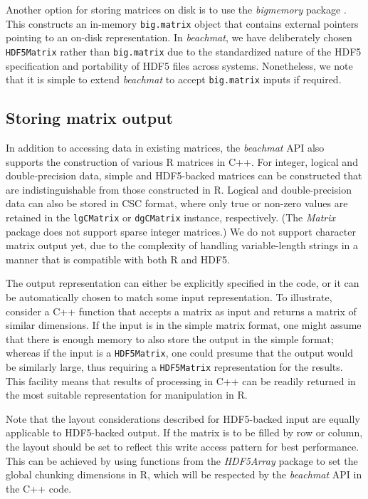 \documentclass[10pt,letterpaper]{article}
\newcommand{\beachmat}{\textit{beachmat}}
\newcommand{\code}[1]{\texttt{#1}}
\begin{document}
Another option for storing matrices on disk is to use the \textit{bigmemory} package \cite{kane2013scalable}.
This constructs an in-memory \code{big.matrix} object that contains external pointers pointing to an on-disk representation.
In \beachmat{}, we have deliberately chosen \code{HDF5Matrix} rather than \code{big.matrix} due to the standardized nature of the HDF5 specification and portability of HDF5 files across systems.
Nonetheless, we note that it is simple to extend \beachmat{} to accept \code{big.matrix} inputs if required.

\subsection*{Storing matrix output}
In addition to accessing data in existing matrices, the \beachmat{} API also supports the construction of various R matrices in C++.
For integer, logical and double-precision data, simple and HDF5-backed matrices can be constructed that are indistinguishable from those constructed in R.
Logical and double-precision data can also be stored in CSC format, where only true or non-zero values are retained in the \code{lgCMatrix} or \code{dgCMatrix} instance, respectively.
(The \textit{Matrix} package does not support sparse integer matrices.)
We do not support character matrix output yet, due to the complexity of handling variable-length strings in a manner that is compatible with both R and HDF5.

The output representation can either be explicitly specified in the code, or it can be automatically chosen to match some input representation.
To illustrate, consider a C++ function that accepts a matrix as input and returns a matrix of similar dimensions.
If the input is in the simple matrix format, one might assume that there is enough memory to also store the output in the simple format;
whereas if the input is a \code{HDF5Matrix}, one could presume that the output would be similarly large, thus requiring a \code{HDF5Matrix} representation for the results.
This facility means that results of processing in C++ can be readily returned in the most suitable representation for manipulation in R.
 
Note that the layout considerations described for HDF5-backed input are equally applicable to HDF5-backed output.
If the matrix is to be filled by row or column, the layout should be set to reflect this write access pattern for best performance.
This can be achieved by using functions from the \textit{HDF5Array} package to set the global chunking dimensions in R, which will be respected by the \beachmat{} API in the C++ code.
\end{document}

